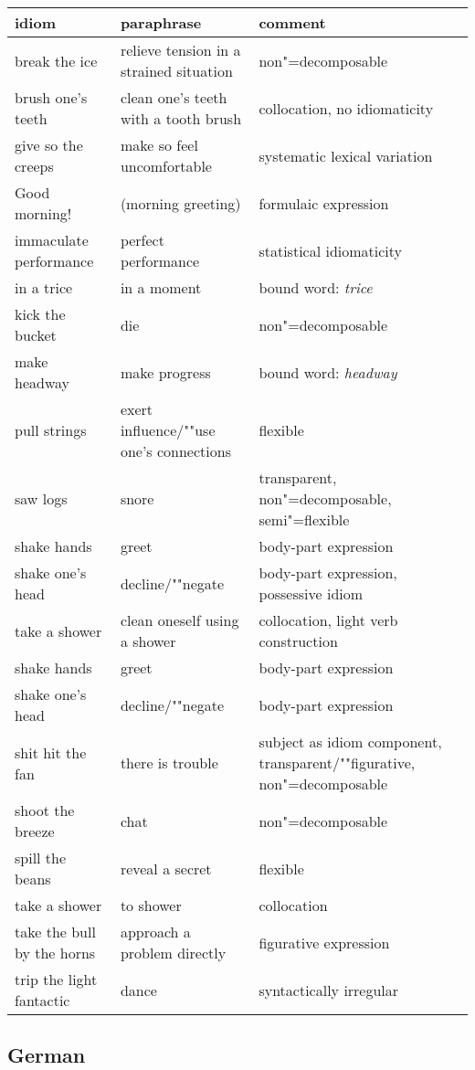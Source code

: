 \documentclass[output=paper]{langsci/langscibook}
\begin{document}
\begin{tabular}{@{}lL{3.8cm}L{3.8cm}@{}}
idiom & paraphrase & comment\\\hline
break the ice      & relieve tension in a strained situation  & non"=decomposable\\
brush one's teeth  & clean one's teeth with a tooth brush     & collocation, no idiomaticity\\
give so the creeps & make so feel uncomfortable               & systematic lexical variation\\
Good morning!      & (morning greeting)                       & formulaic expression\\
immaculate performance & perfect performance & statistical idiomaticity\\
in a trice & in a moment & bound word: \emph{trice}\\
kick the bucket & die & non"=decomposable\\
make headway & make progress & bound word: \emph{headway}\\
pull strings & exert influence/""use one's connections & flexible\\
saw logs & snore & {transparent, non"=decomposable, semi"=flexible}\\
shake hands & greet & body-part expression\\
shake one's head & decline/""negate & {body-part expression, possessive idiom}\\
take a shower & clean oneself using a shower & collocation, light verb construction\\
%
shake hands & greet & body-part expression\\
% 
shake one's head & decline/""negate & body-part expression\\
%
shit hit the fan & there is trouble & {subject as idiom component, transparent/""figurative, non"=decomposable}\\
shoot the breeze & chat & non"=decomposable\\
spill the beans & reveal a secret & flexible\\
take a shower & to shower & collocation\\
take the bull by the horns & {approach a problem directly} & figurative expression\\
trip the light fantactic & dance & syntactically irregular\\
\end{tabular}


\subsection*{German}
\end{document}
